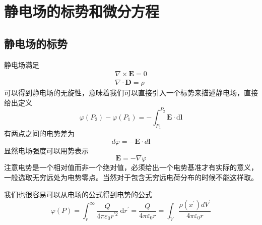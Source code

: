 \section{静电场的标势和微分方程}
    \subsection{静电场的标势}
        静电场满足
            \begin{equation}
                \begin{gathered}
                    \nabla \times \boldsymbol{E} = 0 \\
                    \nabla \cdot \boldsymbol{D} = \rho
                \end{gathered}
            \end{equation}
            可以得到静电场的无旋性，意味着我们可以直接引入一个标势来描述静电场，直接给出定义
            \begin{equation}
                \varphi\left(P_{2}\right)-\varphi\left(P_{1}\right)=-\int_{P_{1}}^{P_{2}} \boldsymbol{E} \cdot \mathrm{d} \boldsymbol{l}
            \end{equation}
            有两点之间的电势差为
            \begin{equation}
                d \varphi = - \boldsymbol{E} \cdot d \boldsymbol{l}
            \end{equation}
            显然电场强度可以用势表示
            \begin{equation}
                \boldsymbol{E} = -\nabla \varphi
            \end{equation}
            注意电势是一个相对值而非一个绝对值，必须给出一个电势基准才有实际的意义，一般选取无穷远处为电势零点。当然对于包含无穷远电荷分布的时候不能这样取。

            我们也很容易可以从电场的公式得到电势的公式
            \begin{equation}
                \varphi(P)=\int_{r}^{\infty} \frac{Q}{4 \pi \varepsilon_{0} r^{\prime 2}} \mathrm{~d} r^{\prime}=\frac{Q}{4 \pi \varepsilon_{0} r}=\int_V \frac{\rho(x^\prime) dV^\prime}{4 \pi \varepsilon_0 r}
                \end{equation}
